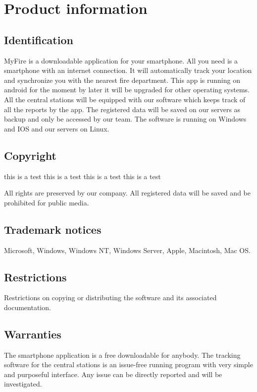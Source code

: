 \chapter{Product information}
\vspace{-6em}


\section{Identification}
MyFire is a downloadable application for your smartphone. All you need is a
smartphone with an internet connection. It will automatically track your
location and synchronize you with the nearest fire department. This app is
running on android for the moment by later it will be upgraded for other
operating systems. All the central stations will be equipped with our software
which keeps track of all the reports by the app. The registered data will be
saved on our servers as backup and only be accessed by our team. The software is
running on Windows and IOS and our servers on Linux.

\section{Copyright}
this is a test
this is a test
this is a test
this is a test

All rights are preserved by our company. All registered data will be saved and
be prohibited for public media. 

\section{Trademark notices}

Microsoft, Windows, Windows NT, Windows Server, Apple, Macintosh, Mac OS.

\section{Restrictions}

Restrictions on copying or distributing the software and its associated
documentation.

\section{Warranties}

The smartphone application is a free downloadable for anybody. The tracking
software for the central stations is an issue-free running program with very
simple and purposeful interface. Any issue can be directly reported and will be
investigated.

